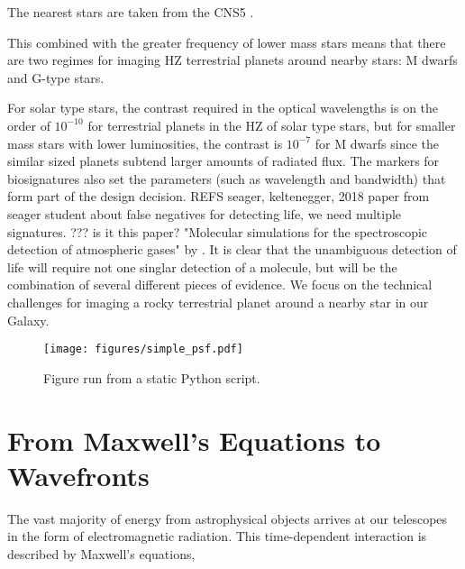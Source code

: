 \documentclass[letterpaper]{ar-1col}
\begin{document}
The nearest stars are taken from the CNS5 \citep{Golovin23}.

This combined with the greater frequency of lower mass stars means that there are two regimes for imaging HZ terrestrial planets around nearby stars: M dwarfs and G-type stars.

For solar type stars, the contrast required in the optical wavelengths is on the order of $10^{-10}$ for terrestrial planets in the HZ of solar type stars, but for smaller mass stars with lower luminosities, the contrast is $10^{-7}$ for M dwarfs since the similar sized planets subtend larger amounts of radiated flux.
%
The markers for biosignatures also set the parameters (such as wavelength and bandwidth) that form part of the design decision.
%
REFS seager, keltenegger, 2018 paper from seager student about false negatives for detecting life, we need multiple signatures. ??? is it this paper? "Molecular simulations for the spectroscopic detection of atmospheric gases" by \citet{Sousa-Silva19}.
%
It is clear that the unambiguous detection of life will require not one singlar detection of a molecule, but will be the combination of several different pieces of evidence.
%
We focus on the technical challenges for imaging a rocky terrestrial planet around a nearby star in our Galaxy.



\begin{figure}[ht]
  \centering
  \texttt{[image: figures/simple\_psf.pdf]}
  \caption{Figure run from a static Python script.}
  \label{fig:simplepsf}
\end{figure}





\begin{armarginnote}[]
\end{armarginnote}


\section{From Maxwell's Equations to Wavefronts}
The vast majority of energy from astrophysical objects arrives at our telescopes in the form of electromagnetic radiation.
%
%
This time-dependent interaction is described by Maxwell's equations,
\end{document}
